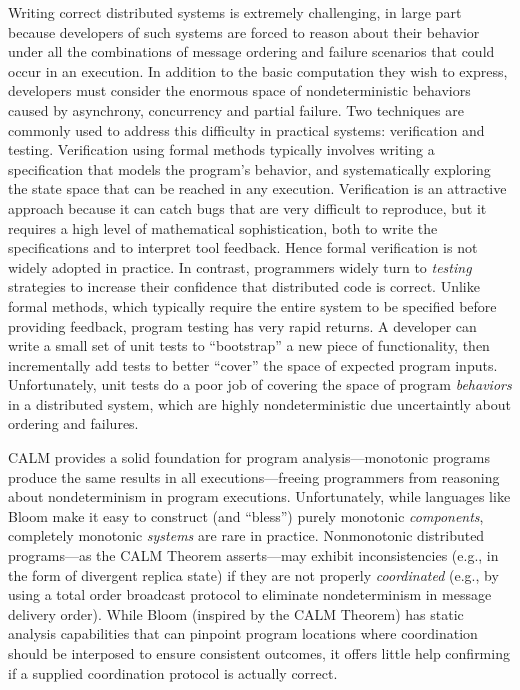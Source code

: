 

Writing correct distributed systems is extremely challenging, in large part
because developers of such systems are forced to reason
about their behavior under all the combinations of message ordering and failure
scenarios that could occur in an execution.
In addition to the basic computation they wish to express, developers
must consider the enormous space of nondeterministic behaviors caused by 
asynchrony, concurrency and partial failure.
Two techniques are commonly used
to address this difficulty in practical systems: verification and testing.
Verification using formal methods typically involves writing a specification
that models the program's behavior, and systematically exploring the state 
space that can be reached in any execution.  Verification is an attractive 
approach because it can catch bugs that are very difficult to reproduce,
but it requires a high level of mathematical sophistication, both to write the 
specifications and to interpret tool feedback.
Hence formal verification is not widely adopted in practice.  
In contrast, programmers widely turn to \emph{testing} strategies to increase
their confidence that distributed code is correct.  Unlike formal methods, 
which typically require the entire system to be specified before providing 
feedback, program testing has very rapid returns.  A developer can write a 
small set of unit tests to ``bootstrap'' a new piece of functionality, then
incrementally add tests to better ``cover'' the space of expected program 
inputs.  Unfortunately, unit tests do a poor job of covering the space of
program \emph{behaviors} in a distributed system, which are highly
nondeterministic due uncertaintly about ordering and failures.

CALM provides a solid foundation for program analysis---monotonic programs
produce the same results in all executions---freeing programmers from reasoning
about nondeterminism in program executions.  Unfortunately, while languages
like Bloom make it easy to construct (and ``bless'') purely monotonic 
\emph{components}, completely monotonic \emph{systems} are rare in practice.
Nonmonotonic distributed programs---as the CALM Theorem asserts---may exhibit
inconsistencies (e.g., in the form of divergent replica state)
if they are not
properly \emph{coordinated} (e.g., by using a total order broadcast protocol
to eliminate nondeterminism in message delivery order).
While Bloom (inspired by the CALM Theorem) has static analysis capabilities
that can pinpoint program locations where coordination should be interposed
to ensure consistent outcomes, it offers little help confirming if a supplied
coordination protocol is actually correct.

